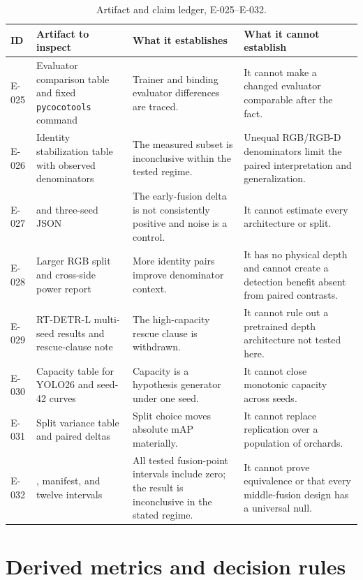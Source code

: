 \begin{table}[t]
\centering\footnotesize
\caption{Artifact and claim ledger, E-025--E-032.}
\begin{tabularx}{\textwidth}{L{0.07\textwidth}L{0.29\textwidth}Y Y}
\toprule
\textbf{ID} & \textbf{Artifact to inspect} & \textbf{What it establishes} & \textbf{What it cannot establish}\\
\midrule
E-025 & Evaluator comparison table and fixed \texttt{pycocotools} command & Trainer and binding evaluator differences are traced. & It cannot make a changed evaluator comparable after the fact.\\
E-026 & Identity stabilization table with observed denominators & The measured subset is inconclusive within the tested regime. & Unequal RGB/RGB-D denominators limit the paired interpretation and generalization.\\
E-027 &  and three-seed JSON & The early-fusion delta is not consistently positive and noise is a control. & It cannot estimate every architecture or split.\\
E-028 & Larger RGB split and cross-side power report & More identity pairs improve denominator context. & It has no physical depth and cannot create a detection benefit absent from paired contrasts.\\
E-029 & RT-DETR-L multi-seed results and rescue-clause note & The high-capacity rescue clause is withdrawn. & It cannot rule out a pretrained depth architecture not tested here.\\
E-030 & Capacity table for YOLO26 and seed-42 curves & Capacity is a hypothesis generator under one seed. & It cannot close monotonic capacity across seeds.\\
E-031 & Split variance table and paired deltas & Split choice moves absolute mAP materially. & It cannot replace replication over a population of orchards.\\
E-032 & , manifest, and twelve intervals & All tested fusion-point intervals include zero; the result is inconclusive in the stated regime. & It cannot prove equivalence or that every middle-fusion design has a universal null.\\
\bottomrule
\end{tabularx}
\end{table}

\section{Derived metrics and decision rules}
\label{app:rules}
